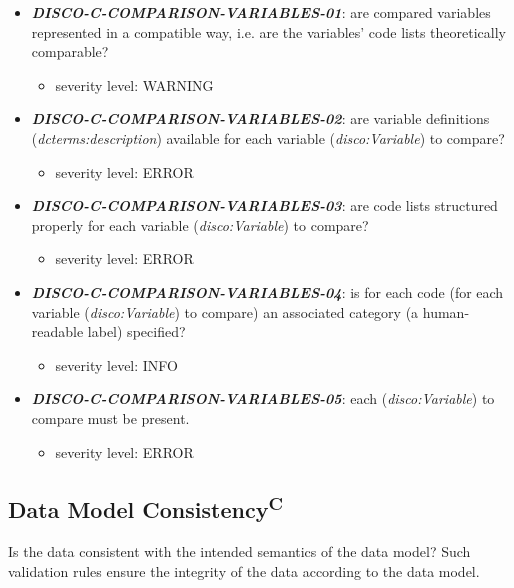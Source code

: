 \documentclass{llncs}
\begin{document}
\begin{itemize}
	\item \textbf{{\em DISCO-C-COMPARISON-VARIABLES-01}}: 
	are compared variables represented in a compatible way, i.e. are the variables' code lists theoretically comparable?
		\begin{itemize}
		\item severity level: WARNING
	\end{itemize}
	\item \textbf{{\em DISCO-C-COMPARISON-VARIABLES-02}}: 
	are variable definitions (\emph{dcterms:description}) available for each variable (\emph{disco:Variable}) to compare?
		\begin{itemize}
		\item severity level: ERROR
	\end{itemize}
	\item \textbf{{\em DISCO-C-COMPARISON-VARIABLES-03}}:
	are code lists structured properly for each variable (\emph{disco:Variable}) to compare?
		\begin{itemize}
		\item severity level: ERROR
	\end{itemize}
	\item \textbf{{\em DISCO-C-COMPARISON-VARIABLES-04}}:
	is for each code (for each variable (\emph{disco:Variable}) to compare) an associated category (a human-readable label) specified?
		\begin{itemize}
		\item severity level: INFO
	\end{itemize}
	\item \textbf{{\em DISCO-C-COMPARISON-VARIABLES-05}}:
	each (\emph{disco:Variable}) to compare must be present.
	\begin{itemize}
		\item severity level: ERROR
	\end{itemize}
\end{itemize}

\subsection{Data Model Consistency\textsuperscript{C}}
Is the data consistent with the intended semantics of the data model?
Such validation rules ensure the integrity of the data according to the data model.
\end{document}
